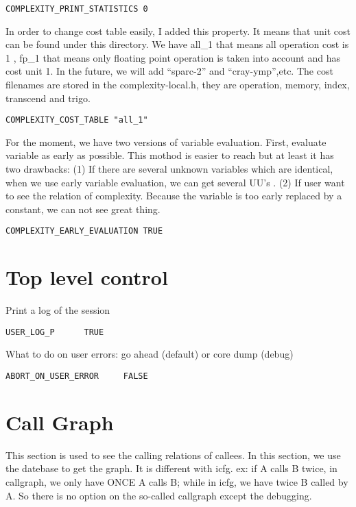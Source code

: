 \begin{verbatim}
COMPLEXITY_PRINT_STATISTICS 0
\end{verbatim}

In order to change cost table easily, I added this property.
It means that unit cost can be found under this directory. We have all_1
that means all operation cost is 1 , fp_1 that means only floating
point operation is taken into account and has cost unit 1.
In the future, we will add ``sparc-2'' and ``cray-ymp'',etc.
The cost filenames are stored in the complexity-local.h, they are operation,
memory, index, transcend and trigo.

\begin{verbatim}
COMPLEXITY_COST_TABLE "all_1"
\end{verbatim}

For the moment, we have two versions of variable evaluation. First,
evaluate variable as early as possible. This mothod is easier to reach
but at least it has two drawbacks: (1) If there are several unknown
variables which are identical, when we use early variable evaluation, we
can get several UU's . (2) If user want to see the relation of
complexity. Because the variable is too early replaced by a constant, we
can not see great thing.

\begin{verbatim}
COMPLEXITY_EARLY_EVALUATION TRUE
\end{verbatim}

\section{Top level control}

Print a log of the session

\begin{verbatim}
USER_LOG_P      TRUE
\end{verbatim}

What to do on user errors: go ahead (default) or core dump (debug)

\begin{verbatim}
ABORT_ON_USER_ERROR     FALSE
\end{verbatim}

\section{Call Graph}
This section is used to see the calling relations of callees.
In this section,
we use the datebase to get the graph. It is different with icfg.
ex: if A calls B twice, in callgraph, we only have ONCE A calls B;
while in icfg, we have twice B called by A.
So there is no option on the so-called callgraph except the debugging.


